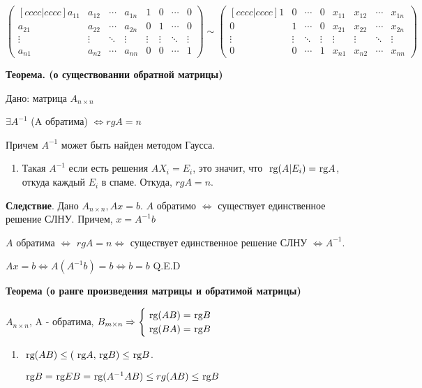 \(
\begin{pmatrix}[cccc|cccc]
    a_{11} & a_{12} & \cdots & a_{1n} & 1      & 0      & \cdots & 0      \\
    a_{21} & a_{22} & \cdots & a_{2n} & 0      & 1      & \cdots & 0      \\
    \vdots & \vdots & \ddots & \vdots & \vdots & \vdots & \ddots & \vdots \\
    a_{n1} & a_{n2} & \cdots & a_{nn} & 0      & 0      & \cdots & 1
\end{pmatrix} \sim
\begin{pmatrix}[cccc|cccc]
    1      & 0      & \cdots & 0      & x_{11} & x_{12} & \cdots & x_{1n} \\
    0      & 1      & \cdots & 0      & x_{21} & x_{22} & \cdots & x_{2n} \\
    \vdots & \vdots & \ddots & \vdots & \vdots & \vdots & \ddots & \vdots \\
    0      & 0      & \cdots & 1      & x_{n1} & x_{n2} & \cdots & x_{nn}
\end{pmatrix}
\)

\textbf{Теорема. (о существовании обратной матрицы)}

Дано: матрица \(A_{n \times n}\)

\(\exists A^{-1}\) (A обратима) \(\Leftrightarrow rg A = n\)

Причем \(A^{-1}\) может быть найден методом Гаусса.
\begin{enumerate}
    \item[] \prooff{}
    Такая $A^{-1}$ если есть решения $AX_i = E_i$, это значит, что $\rg(A|E_i) = \rg A$, откуда каждый $E_i$ в спаме. Откуда, $rg A = n$.
\end{enumerate}

\textbf{Следствие}. Дано \(A_{n \times n}, Ax=b\). \(A\) обратимо \(\Leftrightarrow\) существует единственное решение СЛНУ. Причем, \(x = A^{-1} b\)

\(A\) обратима \(\Leftrightarrow\) \(rg A = n \Leftrightarrow\) существует единственное решение СЛНУ \(\Leftrightarrow A^{-1}\).

\(Ax = b \Leftrightarrow A (A^{-1}b) = b \Leftrightarrow b = b\) Q.E.D

\textbf{Теорема (о ранге произведения матрицы и обратимой матрицы)}

\(A_{n\times n}\), A - обратима, \(B_{m \times n} \Rightarrow
\begin{cases}
    \rg(AB) = \rg B \\
    \rg(BA) = \rg B
\end{cases}
\)
\begin{enumerate}
    \item[] \prooff{}
    $\rg(AB)\leq (\rg A, \rg B)\leq \rg B$.
    
    $\rg B = \rg EB = \rg (A^{-1}AB)\leq rg(AB) \leq \rg B$
\end{enumerate}

